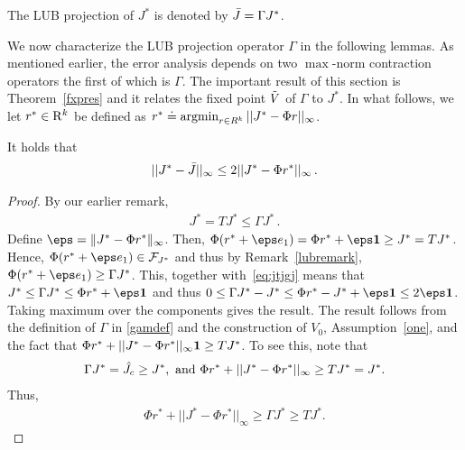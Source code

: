 \begin{definition}\label{bestproj}
The LUB projection of $J^*$ is denoted by $\bar{J}=\Gamma J^*$. 
\end{definition}
We now characterize the LUB projection operator $\Gamma$ in the following lemmas. 
As mentioned earlier, the error analysis depends on two $\max$-norm contraction operators the first of which is $\Gamma$. The important result of this section is Theorem~\ref{fxpres} and it relates the fixed point $\tilde{V}$ of $\Gamma$ to $J^*$.
In what follows, we let $r^*\in \mathrm{R}^k$ be defined as $r^*\doteq\operatorname{argmin}_{r\in R^k}||J^*-\Phi r||_\infty$.
\begin{lemma}\label{bestbnd}
It holds that
\begin{align}
||J^*-\bar{J}||_\infty\leq 2||J^*-\Phi r^*||_\infty\,.
\end{align}
\end{lemma}
\begin{proof}
By our earlier remark, 
\begin{align} \label{eq:jtjgj}
J^* = T J^* \le \Gamma J^*\,.
\end{align}
Define $\eps = \norm{J^* - \Phi r^*}_{\infty}$. Then, $\Phi(r^* + \eps e_1) = \Phi r^* + \eps \one \ge J^* = TJ^*$.
Hence, $\Phi(r^* + \eps e_1) \in \F_{J^*}$ and thus
by Remark~\ref{lubremark}, $\Phi(r^* + \eps e_1) \ge \Gamma J^*$. This, together with~\eqref{eq:jtjgj} means that
$J^* \le \Gamma J^* \le \Phi r^* + \eps \one$ and thus
$0 \le \Gamma J^* - J^* \le \Phi r^* - J^* + \eps \one \le 2 \eps \one$. Taking maximum over the components gives the result.
The result follows from the definition of $\Gamma$ in \eqref{gamdef} and the construction of $V_0$, Assumption~\ref{one}, and the fact that $\Phi r^*+||J^*-\Phi r^*||_\infty \mathbf{1}\geq TJ^*$. To see this, note that
\begin{align}
\Gamma J^*=\hat{J}_c \geq J^*,\nonumber \text{ and }
\Phi r^* +||J^*-\Phi r^*||_\infty\geq TJ^*= J^*.\nonumber
\end{align}
Thus,
\begin{align}
\Phi r^* +||J^*-\Phi r^*||_\infty\geq \Gamma J^*\geq TJ^*.
\end{align}
\fi
\end{proof}

